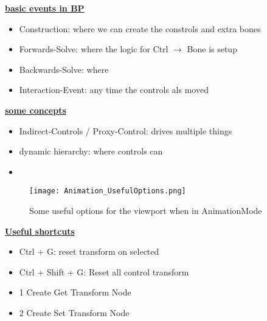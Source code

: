         

        \textbf{\uline{basic events in BP}}        
        \begin{itemize}
            \item Construction: where we can create the constrols and extra bones
            \item Forwards-Solve: where the logic for Ctrl $\rightarrow$ Bone is setup
            \item Backwards-Solve: where 
            \item Interaction-Event: any time the controls als moved
        \end{itemize}
        \textbf{\uline{some concepts}}
        \begin{itemize}
            \item Indirect-Controls / Proxy-Control: drives multiple things
            \item dynamic hierarchy: where controls can
            \item 
        \end{itemize}
        
        \begin{figure}
            \texttt{[image: Animation\_UsefulOptions.png]}
            \caption{Some useful options for the viewport when in AnimationMode}
            \label{}
        \end{figure}

        \textbf{\uline{Useful shortcuts}}
        \begin{itemize}
            \item Ctrl + G: reset transform on selected
            \item Ctrl + Shift + G: Reset all control transform
            \item 1 Create Get Transform Node
            \item 2 Create Set Transform Node
        \end{itemize}

